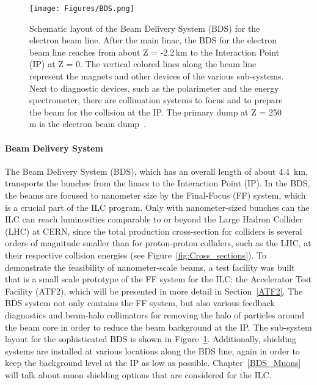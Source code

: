 \begin{figure}[h!]
\centering
\texttt{[image: Figures/BDS.png]}
\caption[Layout of the Beam Delivery System]{Schematic layout of the Beam Delivery System (BDS) for the electron beam line.
After the main linac, the BDS for the electron beam line reaches from about Z = -2.2\,km to the Interaction Point (IP) at Z = 0.
The vertical colored lines along the beam line represent the magnets and other devices of the various sub-systems.
Next to diagnostic devices, such as the polarimeter and the energy spectrometer, there are collimation systems to focus and to prepare the beam for the collision at the IP.
The primary dump at Z = 250\,m is the electron beam dump~\cite[p. 135]{TDR32}.}
\label{fig:BDS}
\end{figure}
\paragraph{Beam Delivery System}
The Beam Delivery System (BDS), which has an overall length of about \SI{4.4}{\kilo\meter}, transports the bunches from the linacs to the Interaction Point (IP).
In the BDS, the beams are focused to nanometer size by the Final-Focus (FF) system, which is a crucial part of the ILC program.
Only with nanometer-sized bunches can the ILC can reach luminosities comparable to or beyond the Large Hadron Collider (LHC) at CERN, since the total production cross-section for \positron \electron colliders is several orders of magnitude smaller than for proton-proton colliders, such as the LHC, at their respective collision energies (see Figure~\ref{fig:Cross_sections}).
To demonstrate the feasibility of nanometer-scale beams, a test facility was built that is a small scale prototype of the FF system for the ILC: the Accelerator Test Facility (ATF2), which will be presented in more detail in Section~\ref{ATF2}.
The BDS system not only contains the FF system, but also various feedback diagnostics and beam-halo collimators for removing the halo of particles around the beam core in order to reduce the beam background at the IP. 
The sub-system layout for the sophisticated BDS is shown in Figure~\ref{fig:BDS}.
Additionally, shielding systems are installed at various locations along the BDS line, again in order to keep the background level at the IP as low as possible.
Chapter~\ref{BDS_Muons} will talk about muon shielding options that are considered for the ILC.

